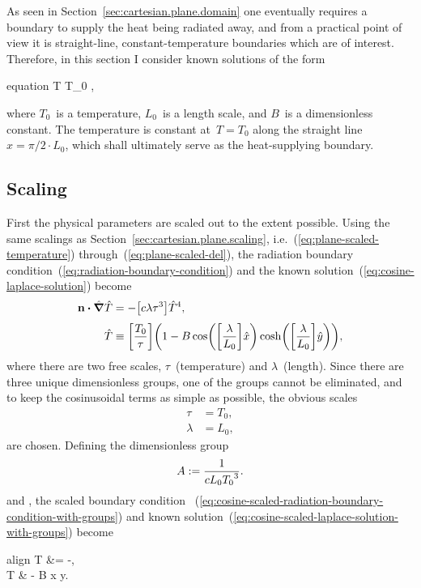 As seen in Section~\ref{sec:cartesian.plane.domain}
one eventually requires a boundary to supply the heat being radiated away,
and from a practical point of view it is
straight-line, constant-temperature boundaries which are of interest.
Therefore, in this section I consider known solutions of the form
\begin{important}{equation}
  T \ideq T_0 ,
  \label{eq:cosine-laplace-solution}
\end{important}
where $T_0$~is a temperature, $L_0$~is a length scale,
and $B$~is a dimensionless constant.
The temperature is constant at~$T = T_0$
along the straight line~$x = \pi/2 \cdot L_0$,
which shall ultimately serve as the heat-supplying boundary.

\subsection{Scaling}
\label{sec:cartesian.cosine.scaling}

First the physical parameters are scaled out to the extent possible.
Using the same scalings as Section~\ref{sec:cartesian.plane.scaling},
i.e.~(\ref{eq:plane-scaled-temperature}) through~(\ref{eq:plane-scaled-del}),
the radiation boundary condition~(\ref{eq:radiation-boundary-condition})
and the known solution~(\ref{eq:cosine-laplace-solution})
become
\begin{align}
  \normalvec \dotp \scaleddel \scaled{T}
    &= -\group{c \lambda \tau^3} \scaled{T}^4,
    \label{eq:cosine-scaled-radiation-boundary-condition-with-groups}
    \\[\tallspace]
  \scaled{T}
    &\ideq
      \group{\frac{T_0}{\tau}}
      \roundbr*{
        1 -
          B
          \cos \roundbr*{\group{\frac{\lambda}{L_0}} \scaled{x}}
          \cosh \roundbr*{\group{\frac{\lambda}{L_0}} \scaled{y}}
      },
    \label{eq:cosine-scaled-laplace-solution-with-groups}
\end{align}
where there are two free scales, $\tau$~(temperature) and $\lambda$~(length).
Since there are three unique dimensionless groups,
one of the groups cannot be eliminated,
and to keep the cosinusoidal terms as simple as possible,
the obvious scales
\begin{align}
  \tau &= T_0,
    \label{eq:cosine-temperature-scale} \\
  \lambda &= L_0,
    \label{eq:cosine-length-scale}
\end{align}
are chosen.
Defining the dimensionless group
\begin{equation}
  A := \frac{1}{c L_0 {T_0}^3}.
  \label{eq:cosine-dimensionless-group}
\end{equation}
and ,
the scaled boundary condition~%
  (\ref{eq:cosine-scaled-radiation-boundary-condition-with-groups})
and known solution~(\ref{eq:cosine-scaled-laplace-solution-with-groups})
become
\begin{important}{align}
  \normalvec \dotp \del T &= -,
    \label{eq:cosine-scaled-radiation-boundary-condition} \\[\tallspace]
  T & - B \cos x \cosh y.
    \label{eq:cosine-scaled-laplace-solution}
\end{important}


